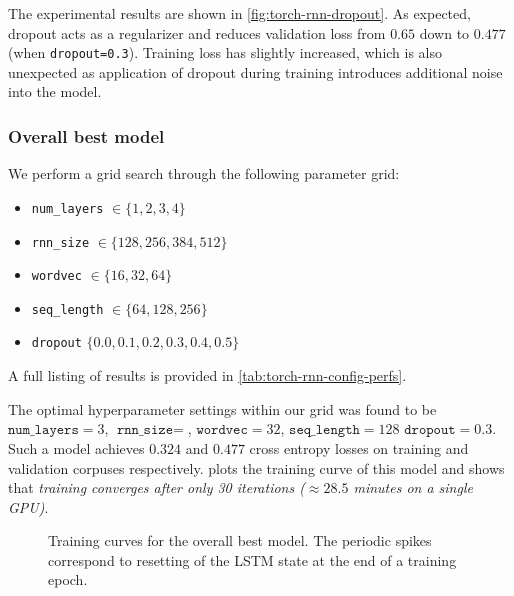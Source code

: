 The experimental results are shown in \cref{fig:torch-rnn-dropout}. As
expected, dropout acts as a regularizer and reduces validation loss from $0.65$
down to $0.477$ (when \texttt{dropout=0.3}). Training loss has slightly
increased, which is also unexpected as application of dropout during training
introduces additional noise into the model.

\subsubsection{Overall best model}\label{sec:overall-best-model}

We perform a grid search through the following parameter grid:
\begin{itemize}
  \item \texttt{num\_layers} $\in \{1,2,3,4\}$
  \item \texttt{rnn\_size} $\in \{128, 256, 384, 512\}$
  \item \texttt{wordvec} $\in \{16, 32, 64\}$
  \item \texttt{seq\_length} $\in \{64,128,256\}$
  \item \texttt{dropout} $\{0.0, 0.1, 0.2, 0.3, 0.4, 0.5 \}$
\end{itemize}
A full listing of results is provided in \vref{tab:torch-rnn-config-perfs}.

The optimal hyperparameter settings within our grid was found to be
$\texttt{num\_layers}=3$, $\texttt{rnn\_size}=$, $\texttt{wordvec}=32$,
$\texttt{seq\_length}=128$ $\texttt{dropout}=0.3$. Such a model achieves
$0.324$ and $0.477$ cross entropy losses on training and validation corpuses
respectively.  plots the training curve of
this model and shows that \emph{training converges after only 30 iterations ($\approx
28.5$ minutes on a single GPU)}.

\begin{figure}[tb]
  \centering
  
  \caption{Training curves for the overall best model. The periodic spikes correspond
  to resetting of the LSTM state at the end of a training epoch.}
  \label{fig:torch-rnn-best-model-trace}
\end{figure}

